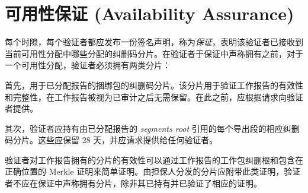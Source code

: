 \section{可用性保证 (Availability Assurance)}\label{sec:assurance}

每个时隙，每个验证者都应发布一份签名声明，称为\emph{保证}，表明该验证者已接收到当前可用性分配中哪些分配的纠删码分片。在验证者于保证中声称拥有之前，对于一个可用性分配，验证者必须拥有两类分片：

首先，用于已分配报告的捆绑包的纠删码分片。该分片用于验证工作报告的有效性和完整性，在工作报告被视为已审计之后无需保留。在此之前，应根据请求向验证者提供。

其次，验证者应持有由已分配报告的 \emph{segments root} 引用的每个导出段的相应纠删码分片。这些应保留 28 天，并应请求提供给任何验证者。

验证者对工作报告拥有的分片的有效性可以通过工作报告的工作包纠删根和包含在正确位置的 Merkle 证明来简单证明。由担保人分发的分片应附带此类证明，验证者不应在保证中声称拥有分片，除非其已持有并已验证了相应的证明。
